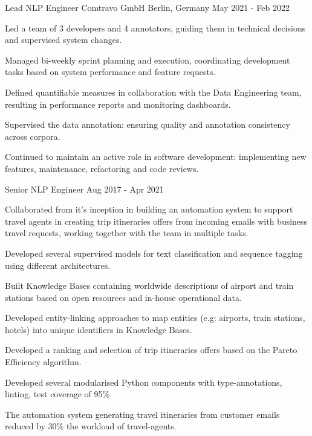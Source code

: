 \begin{cventries}

\cventry
    {Lead NLP Engineer} 
    {Comtravo GmbH} 
    {Berlin, Germany} 
    {May 2021 - Feb 2022}
    {
      \begin{cvitems} 
		  \item {Led a team of 3 developers and 4 annotators, guiding them in technical decisions and supervised system changes.}
		  \item {Managed bi-weekly sprint planning and execution, coordinating development tasks based on system performance and feature requests.}
		  \item {Defined quantifiable measures in collaboration with the Data Engineering team, resulting in performance reports and monitoring dashboards.}
		  \item {Supervised the data annotation: ensuring quality and annotation consistency across corpora.}
		  \item {Continued to maintain an active role in software development: implementing new features, maintenance, refactoring and code reviews.}
        \end{cvitems}
 	}


  \cventry
    {Senior NLP Engineer}
    {} %
    {} %
    {Aug 2017 - Apr 2021} %
    {
      \begin{cvitems}
		\item {Collaborated from it's inception in building an automation system to support travel agents in creating trip itineraries offers from incoming emails with business travel requests, working together with the team in multiple tasks.}
		\item {Developed several supervised models for text classification and sequence tagging using different architectures.}
		\item {Built Knowledge Bases containing worldwide descriptions of airport and train stations based on open resources and in-house operational data.}
		\item {Developed entity-linking approaches to map entities (e.g: airports, train stations, hotels) into unique identifiers in Knowledge Bases.}
		\item {Developed a ranking and selection of trip itineraries offers based on the Pareto Efficiency algorithm.}
		\item {Developed several modularised Python components with type-annotations, linting, test coverage of 95\%.}
		\item {The automation system generating travel itineraries from customer emails reduced by 30\% the workload of travel-agents.}
        \end{cvitems}
 	}


\end{cventries}
